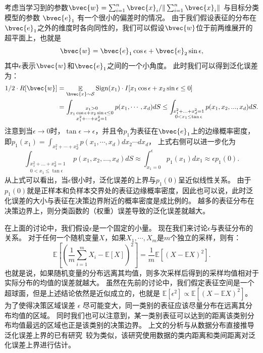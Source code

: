 考虑当学习到的参数$\bvec{w} = \sum_{i=1}^n \bvec{x}_i / \Vert \sum_{i=1}^n \bvec{x}_i \Vert$ 与目标分类模型的参数 $\bvec{e}_1$ 有一个很小的偏差时的情况。
%
由于我们假设表征的分布在$\bvec{e}_1$之外的维度时各向同性的，我们可以假设$\bvec{w}$位于前两维展开的超平面上，也就是
\begin{equation}
    \bvec{w} = \bvec{e}_1 \cos \epsilon + \bvec{e}_2 \sin \epsilon,    
\end{equation}
其中$\epsilon$表示$\bvec{w}$和$\bvec{e}_1$之间的一个小角度。
%
此时我们可以得到泛化误差为：
\begin{equation}
\begin{split}
    1/2\cdot R[\bvec{w}] &= \mathop{\mathbb E}_{\bvec{x} \sim \mathcal S} \text{Sign}(x_1) \cdot I[x_1 \cos \epsilon + x_2 \sin \epsilon \le 0]
    \\
    & = \int_{\substack{x_1 > 0 \\ x_1 \cos \epsilon + x_2 \sin \epsilon \le 0 \\ x_1^2 + \cdots + x_d^2 = 1}} p(x_1, \cdots, x_d)dS
      \le \int_{\substack{x_1^2 + ... + x_d^2 = 1 \\0 < x_1 \le \tan\epsilon}}p(x_1, x_2, ...,x_d)dS.
\end{split}
\end{equation}
注意到当$\epsilon \to 0$时，$\tan \epsilon \to \epsilon$，并且令$p_1$为表征在$\bvec{e}_1$上的边缘概率密度，即$p_1(x_1) = \int_{x_1^2 + \cdots + x_d^2} p(x_1, \cdots, x_d) dx_2\cdots dx_d$，
%
上式右侧可以进一步化为
\begin{equation}
    \int_{\substack{x_1^2 + ... + x_d^2 = 1 \\0 < x_1 \le \tan\epsilon}}p(x_1, x_2, ...,x_d)dS \approx \int_{x_1 = 0}^{\epsilon} p_1(x_1) dx_1 \approx \epsilon p_1(0).
\end{equation}
%
从上式可以看出，当$\epsilon$很小时，泛化误差的上界与$p_1(0)$呈近似线性关系。
由于$p_1(0)$就是正样本和负样本交界处的表征边缘概率密度，因此也可以说，此时泛化误差的大小与表征在决策边界附近的概率密度是成比例的。
越多的表征分布在决策边界上，则分类函数的（权重）误差导致的泛化误差就越大。

在上面的讨论中，我们假设$\epsilon$是一个固定的小量。
%
现在我们来讨论$\epsilon$与表征分布的关系。
%
对于任何一个随机变量$X$，如果$X_1, \cdots, X_m$是$m$个独立的采样，则有：
\begin{equation}
    \mathbb E \left[ \left(\dfrac{1}{m}\sum_{i=1}^m X_i - \mathbb E[X] \right)^2 \right] = \dfrac{1}{m} \mathbb E\left[\left(X -\mathbb EX\right)^2 \right].
\end{equation}
%
也就是说，如果随机变量的分布远离其均值，则多次采样后得到的采样均值相对于实际分布的均值的误差就越大。
%
虽然在先前的讨论中，我们假定表征空间是一个超球面，但是上述结论依然是近似成立的，也就是 $\mathbb E[\epsilon^2]\propto \mathbb E\left[(X - \mathbb EX)^2\right]$。
为了使得决策区域误差 $\epsilon$ 尽可能变大，同一类别的表征应该尽量分布在远离其分布均值的区域。
同时我们也可以注意到，某一类别表征可以达到的距离该类别分布均值最远的区域也正是该类别的决策边界。
%
上文的分析与从数据分布直接推导泛化误差上界的已有研究~\cite{jinpengzhan2020generalization}较为类似，该研究使用数据的类内距离和类间距离对泛化误差上界进行估计。


